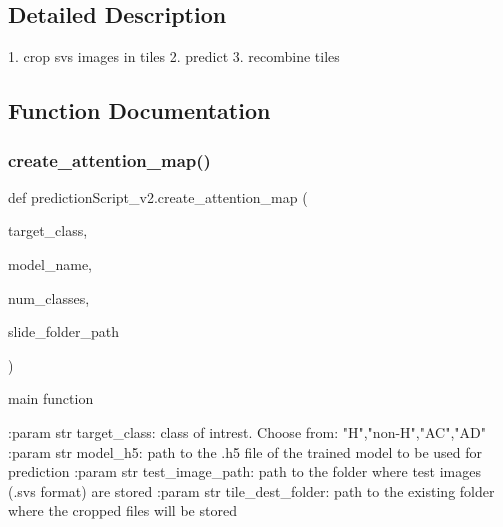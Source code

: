 \subsection{Detailed Description}
\begin{DoxyVerb}1. crop svs images in tiles
2. predict
3. recombine tiles
\end{DoxyVerb}
 

\subsection{Function Documentation}
\mbox{\label{namespacepredictionScript__v2_a2c9da50db5049263eaff30deb3dfe287}} 
\subsubsection{\texorpdfstring{create\+\_\+attention\+\_\+map()}{create\_attention\_map()}}
{\footnotesize\ttfamily def prediction\+Script\+\_\+v2.\+create\+\_\+attention\+\_\+map (\begin{DoxyParamCaption}\item[{}]{target\+\_\+class,  }\item[{}]{model\+\_\+name,  }\item[{}]{num\+\_\+classes,  }\item[{}]{slide\+\_\+folder\+\_\+path }\end{DoxyParamCaption})}

\begin{DoxyVerb}main function

:param str target_class: class of intrest. Choose from: "H","non-H","AC","AD"
:param str model_h5: path to the .h5 file of the trained model to be used for prediction
:param str test_image_path: path to the folder where test images (.svs format) are stored
:param str tile_dest_folder: path to the existing folder where the cropped files will be stored
\end{DoxyVerb}
 \mbox{\label{namespacepredictionScript__v2_a4a283a90ac878184d28aaa1803b25869}} 
